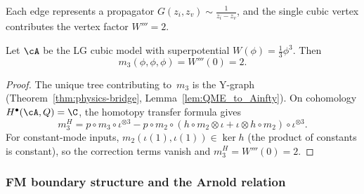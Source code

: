Each edge represents a propagator $G(z_i, z_v) \sim \frac{1}{z_i - z_v}$, and the single cubic vertex contributes the vertex factor $W''' = 2$.

\begin{proposition}
\label{prop:LG_m3_formula}
Let\/ $\cA$ be the LG cubic model with superpotential
$W(\phi) = \tfrac{1}{3}\phi^3$. Then
\begin{equation}
m_3(\phi, \phi, \phi) = W'''(0) = 2.
\end{equation}
\end{proposition}

\begin{proof}
The unique tree contributing to~$m_3$ is the Y-graph
(Theorem~\ref{thm:physics-bridge}, Lemma~\ref{lem:QME_to_Ainfty}).
On cohomology $H^\bullet(\cA, Q) = \C$, the homotopy transfer formula gives
\[
 m_3^H = p \circ m_3 \circ \iota^{\otimes 3}
 - p \circ m_2 \circ (h \circ m_2 \otimes \iota
 + \iota \otimes h \circ m_2) \circ \iota^{\otimes 3}.
\]
For constant-mode inputs, $m_2(\iota(1), \iota(1)) \in \ker h$ (the product of constants is constant), so the correction terms vanish and $m_3^H = W'''(0) = 2$.
\end{proof}

\subsubsection{FM boundary structure and the Arnold relation}

